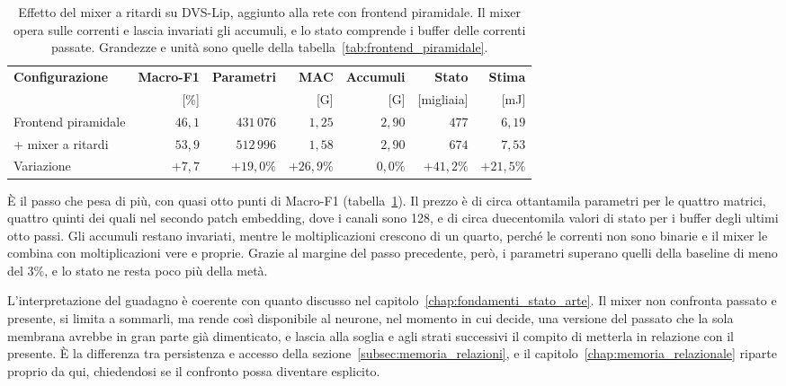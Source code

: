 \begin{table}[t]
\centering
\small
\renewcommand{\arraystretch}{1.2}
\caption[Effetto del mixer a ritardi]{Effetto del mixer a ritardi su DVS-Lip, aggiunto alla rete con frontend piramidale. Il mixer opera sulle correnti e lascia invariati gli accumuli, e lo stato comprende i buffer delle correnti passate. Grandezze e unità sono quelle della tabella~\ref{tab:frontend_piramidale}.}
\label{tab:mixer_ritardi}
\begin{adjustbox}{max width=\textwidth}
\begin{tabular}{@{}l r r r r r r@{}}
\hline
\textbf{Configurazione} & \textbf{Macro-F1} & \textbf{Parametri} & \textbf{MAC} & \textbf{Accumuli} & \textbf{Stato} & \textbf{Stima} \\
 & [\%] & & [G] & [G] & [migliaia] & [mJ] \\
\hline
Frontend piramidale & $46{,}1$ & $431\,076$ & $1{,}25$ & $2{,}90$ & $477$ & $6{,}19$ \\
+ mixer a ritardi & $53{,}9$ & $512\,996$ & $1{,}58$ & $2{,}90$ & $674$ & $7{,}53$ \\
\hline
Variazione & $+7{,}7$ & $+19{,}0\%$ & $+26{,}9\%$ & $0{,}0\%$ & $+41{,}2\%$ & $+21{,}5\%$ \\
\hline
\end{tabular}
\end{adjustbox}
\end{table}

È il passo che pesa di più, con quasi otto punti di Macro-F1 (tabella~\ref{tab:mixer_ritardi}). Il prezzo è di circa ottantamila parametri per le quattro matrici, quattro quinti dei quali nel secondo patch embedding, dove i canali sono 128, e di circa duecentomila valori di stato per i buffer degli ultimi otto passi. Gli accumuli restano invariati, mentre le moltiplicazioni crescono di un quarto, perché le correnti non sono binarie e il mixer le combina con moltiplicazioni vere e proprie. Grazie al margine del passo precedente, però, i parametri superano quelli della baseline di meno del $3\%$, e lo stato ne resta poco più della metà.

L'interpretazione del guadagno è coerente con quanto discusso nel capitolo~\ref{chap:fondamenti_stato_arte}. Il mixer non confronta passato e presente, si limita a sommarli, ma rende così disponibile al neurone, nel momento in cui decide, una versione del passato che la sola membrana avrebbe in gran parte già dimenticato, e lascia alla soglia e agli strati successivi il compito di metterla in relazione con il presente. È la differenza tra persistenza e accesso della sezione~\ref{subsec:memoria_relazioni}, e il capitolo~\ref{chap:memoria_relazionale} riparte proprio da qui, chiedendosi se il confronto possa diventare esplicito.

